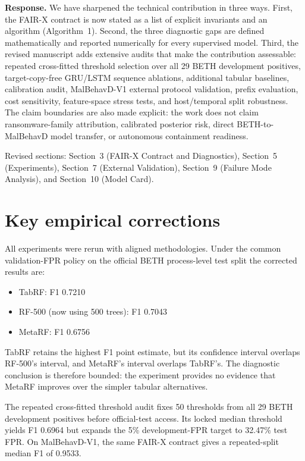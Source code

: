\documentclass[11pt]{article}
\begin{document}
\begin{enumerate}[label=\textbf{Comment~\arabic*:},leftmargin=*,align=left]
\textbf{Response.} We have sharpened the technical contribution in three ways. First, the FAIR-X contract is now stated as a list of explicit invariants and an algorithm (Algorithm~1). Second, the three diagnostic gaps are defined mathematically and reported numerically for every supervised model. Third, the revised manuscript adds extensive audits that make the contribution assessable: repeated cross-fitted threshold selection over all 29 BETH development positives, target-copy-free GRU/LSTM sequence ablations, additional tabular baselines, calibration audit, MalBehavD-V1 external protocol validation, prefix evaluation, cost sensitivity, feature-space stress tests, and host/temporal split robustness. The claim boundaries are also made explicit: the work does not claim ransomware-family attribution, calibrated posterior risk, direct BETH-to-MalBehavD model transfer, or autonomous containment readiness.

Revised sections: Section~3 (FAIR-X Contract and Diagnostics), Section~5 (Experiments), Section~7 (External Validation), Section~9 (Failure Mode Analysis), and Section~10 (Model Card).

\end{enumerate}

\section*{Key empirical corrections}

All experiments were rerun with aligned methodologies. Under the common validation-FPR policy on the official BETH process-level test split the corrected results are:

\begin{itemize}[nosep]
    \item TabRF: F1 0.7210
    \item RF-500 (now using 500 trees): F1 0.7043
    \item MetaRF: F1 0.6756
\end{itemize}

TabRF retains the highest F1 point estimate, but its confidence interval overlaps RF-500's interval, and MetaRF's interval overlaps TabRF's. The diagnostic conclusion is therefore bounded: the experiment provides no evidence that MetaRF improves over the simpler tabular alternatives.

The repeated cross-fitted threshold audit fixes 50 thresholds from all 29 BETH development positives before official-test access. Its locked median threshold yields F1 0.6964 but expands the 5\% development-FPR target to 32.47\% test FPR. On MalBehavD-V1, the same FAIR-X contract gives a repeated-split median F1 of 0.9533.
\end{document}
